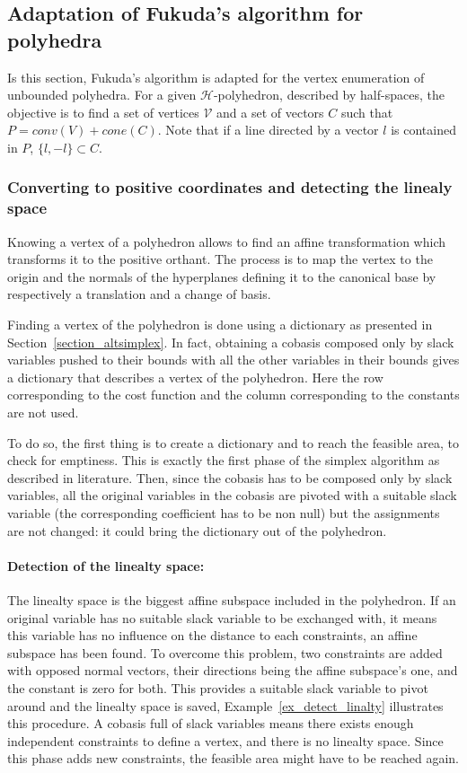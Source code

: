 \subsection{Adaptation of Fukuda's algorithm for polyhedra}

Is this section, Fukuda's algorithm is adapted for the vertex enumeration of unbounded polyhedra. For a given $\mathcal{H}$-polyhedron, described by half-spaces, the objective is to find a set of vertices $\mathcal{V}$ and a set of vectors $C$ such that $P = conv(V)+cone(C)$. Note that if a line directed by a vector $l$ is contained in $P$, $\{l,-l\}\subset C$.

\subsubsection{Converting to positive coordinates and detecting the linealy space}

Knowing a vertex of a polyhedron allows to find an affine transformation which transforms it to the positive orthant. The process is to map the vertex to the origin and the normals of the hyperplanes defining it to the canonical base by respectively a translation and a change of basis.

Finding a vertex of the polyhedron is done using a dictionary as presented in Section~\ref{section_altsimplex}. In fact, obtaining a cobasis composed only by slack variables pushed to their bounds with all the other variables in their bounds gives a dictionary that describes a vertex of the polyhedron. Here the row corresponding to the cost function and the column corresponding to the constants are not used.


To do so, the first thing is to create a dictionary and to reach the feasible area, to check for emptiness. This is exactly the first phase of the simplex algorithm as described in literature. Then, since the cobasis has to be composed only by slack variables, all the original variables in the cobasis are pivoted with a suitable slack variable (the corresponding coefficient has to be non null) but the assignments are not changed: it could bring the dictionary out of the polyhedron. 


\paragraph*{Detection of the linealty space:} The linealty space is the biggest affine subspace included in the polyhedron. If an original variable has no suitable slack variable to be exchanged with, it means this variable has no influence on the distance to each constraints,  an affine subspace has been found. To overcome this problem, two constraints are added with opposed normal vectors, their directions being the affine subspace's one, and the constant is zero for both. This provides a suitable slack variable to pivot around and the linealty space is saved, Example~\ref{ex_detect_linalty} illustrates this procedure. A cobasis full of slack variables means there exists enough independent constraints to define a vertex, and there is no linealty space. Since this phase adds new constraints, the feasible area might have to be reached again.

